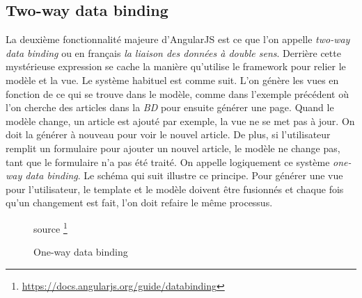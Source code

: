 \documentclass[letterpaper,10pt,oneside]{sphinxmanual}
\begin{document}
\subsection{Two-way data binding}
\label{angularjs:two-way-data-binding}
La deuxième fonctionnalité majeure d'AngularJS est ce que l'on appelle \emph{two-way data binding} ou en français \emph{la liaison des données à double sens}. Derrière cette mystérieuse expression se cache la manière qu'utilise le framework pour relier le modèle et la vue. Le système habituel est comme suit. L'on génère les vues en fonction de ce qui se trouve dans le modèle, comme dans l'exemple précédent où l'on cherche des articles dans la \emph{BD} pour ensuite générer une page. Quand le modèle change, un article est ajouté par exemple, la vue ne se met pas à jour. On doit la générer à nouveau pour voir le nouvel article. De plus, si l'utilisateur remplit un formulaire pour ajouter un nouvel article, le modèle ne change pas, tant que le formulaire n'a pas été traité. On appelle logiquement ce système \emph{one-way data binding}. Le schéma qui suit illustre ce principe. Pour générer une vue pour l'utilisateur, le template et le modèle doivent être fusionnés et chaque fois qu'un changement est fait, l'on doit refaire le même processus.
\begin{figure}[htbp]
\centering
\capstart

\caption{One-way data binding}{\small 
source \footnote{
\href{https://docs.angularjs.org/guide/databinding}{https://docs.angularjs.org/guide/databinding}
}
}\end{figure}
\end{document}
